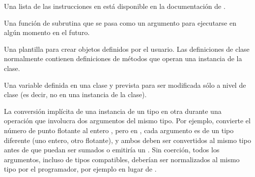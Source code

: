 \documentclass[a4,10pt,spanish]{sphinxmanual}
\begin{document}
\begin{description}
\sphinxAtStartPar
Una lista de las instrucciones en  está disponible en la documentación de .

\item[{retrollamada\index{retrollamada@\spxentry{retrollamada}|spxpagem}\phantomsection\label{\detokenize{glossary:term-callback}}}] \leavevmode
\sphinxAtStartPar
Una función de subrutina que se pasa como un argumento para ejecutarse en algún momento en el futuro.

\item[{clase\index{clase@\spxentry{clase}|spxpagem}\phantomsection\label{\detokenize{glossary:term-class}}}] \leavevmode
\sphinxAtStartPar
Una plantilla para crear objetos definidos por el usuario. Las definiciones de clase normalmente contienen definiciones de métodos que operan una instancia de la clase.

\item[{variable de clase\index{variable de clase@\spxentry{variable de clase}|spxpagem}\phantomsection\label{\detokenize{glossary:term-class-variable}}}] \leavevmode
\sphinxAtStartPar
Una variable definida en una clase y prevista para ser modificada sólo a nivel de clase (es decir, no en una instancia de la clase).

\item[{coerción\index{coerción@\spxentry{coerción}|spxpagem}\phantomsection\label{\detokenize{glossary:term-coercion}}}] \leavevmode
\sphinxAtStartPar
La conversión implícita de una instancia de un tipo en otra durante una operación que involucra dos argumentos del mismo tipo. Por ejemplo,  convierte el número de punto flotante al entero , pero en , cada argumento es de un tipo diferente (uno entero, otro flotante), y ambos deben ser convertidos al mismo tipo antes de que puedan ser sumados o emitiría un . Sin coerción, todos los argumentos, incluso de tipos compatibles, deberían ser normalizados al mismo tipo por el programador, por ejemplo  en lugar de .


\end{description}
\end{document}
